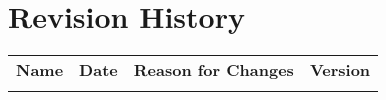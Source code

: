 \chapter*{Revision History}

\begin{table}[h]
	\begin{tabularx}{\textwidth}{|l|c|X|c|}
		\hline
		\textbf{Name} & \textbf{Date} & \textbf{Reason for Changes} & \textbf{Version}\\

		\revision{}{}{}{}
		\revision{}{}{}{}
		\revision{}{}{}{}

		\hline
	\end{tabularx}
\end{table}
